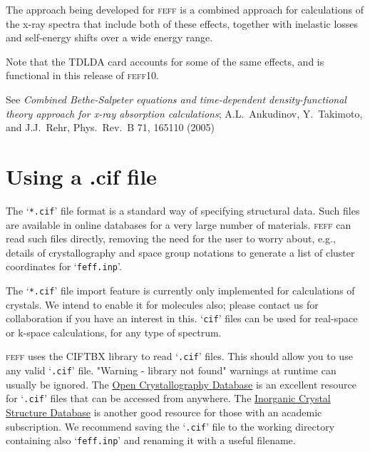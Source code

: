 \documentclass[11pt,oneside]{report} %
\newcommand{\feffcurrent}{\textsc{feff10}}
\renewcommand{\htmladdnormallink}[2]{\href{#2}{#1}}
\renewcommand{\htmlref}[2]{\hyperlink{#2}{#1}}
\newcommand{\program}[1]{\textsc{#1}}
\newcommand{\feff}{\program{feff}}
\newcommand{\file}[1]{`\texttt{#1}'}
\renewcommand{\htmlref}[2]{{#1}} %
\begin{document}
The approach being developed for {\feff} is a combined approach for 
calculations of the x-ray spectra that include both of these effects, 
together with inelastic losses and self-energy shifts over a wide 
energy range. 

Note that the \htmlref{TDLDA}{card:tdl} card accounts for some of the same 
effects, and is functional in this release of {\feffcurrent}.

See \emph{Combined Bethe-Salpeter equations and time-dependent density-functional 
theory approach for x-ray absorption calculations}; A.L.\ Ankudinov, Y.\ Takimoto, 
and J.J.\ Rehr, Phys.\ Rev.\ B 71, 165110 (2005)



\section{Using a .cif file}

The \file{*.cif} file format is a standard way of specifying structural data.  Such files are available in online databases for a very large number of materials.  {\feff} can read such files directly, removing the need for the user to worry about, e.g., details of crystallography and space group notations to generate a list of cluster coordinates for \file{feff.inp}.  

The \file{*.cif} file import feature is currently only implemented for calculations of crystals.  We intend to enable it for molecules also; please contact us for collaboration if you have an interest in this.  \file{cif} files can be used for real-space or k-space calculations, for any type of spectrum.

{\feff} uses the CIFTBX library to read \file{.cif} files.  This should allow you to use any valid \file{.cif} file.  "Warning - library not found" warnings at runtime can usually be ignored.  The \htmladdnormallink{Open Crystallography Database}{http://www.crystallography.net/search.html} is an excellent resource for \file{.cif} files that can be accessed from anywhere.  The \htmladdnormallink{Inorganic Crystal Structure Database}{http://icsd.fiz-karlsruhe.de/} is another good resource for those with an academic subscription.  We recommend saving the \file{.cif} file to the working directory containing also \file{feff.inp} and renaming it with a useful filename.
\end{document}
